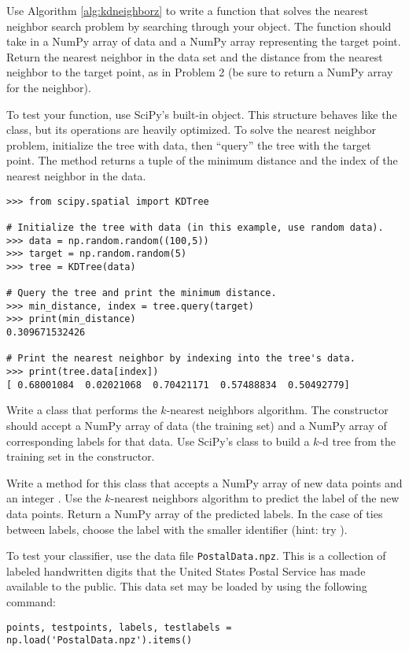 Use Algorithm \ref{alg:kdneighborz} to write a function that solves the nearest neighbor search problem by searching through your  object.
The function should take in a NumPy array of data and a NumPy array representing the target point.
Return the nearest neighbor in the data set and the distance from the nearest neighbor to the target point, as in Problem 2 (be sure to return a NumPy array for the neighbor).

To test your function, use SciPy's built-in  object.
This structure behaves like the  class, but its operations are heavily optimized.
To solve the nearest neighbor problem, initialize the tree with data, then ``query'' the tree with the target point.
The  method returns a tuple of the minimum distance and the index of the nearest neighbor in the data.

\begin{lstlisting}
>>> from scipy.spatial import KDTree

# Initialize the tree with data (in this example, use random data).
>>> data = np.random.random((100,5))
>>> target = np.random.random(5)
>>> tree = KDTree(data)

# Query the tree and print the minimum distance.
>>> min_distance, index = tree.query(target)
>>> print(min_distance)
0.309671532426

# Print the nearest neighbor by indexing into the tree's data.
>>> print(tree.data[index])
[ 0.68001084  0.02021068  0.70421171  0.57488834  0.50492779]
\end{lstlisting}
Write a class that performs the $k$-nearest neighbors algorithm.
The constructor should accept a NumPy array of data (the training set) and a NumPy array of corresponding labels for that data.
Use SciPy's  class to build a $k$-d tree from the training set in the constructor.

Write a method for this class that accepts a NumPy array of new data points and an integer .
Use the $k$-nearest neighbors algorithm to predict the label of the new data points.
Return a NumPy array of the predicted labels.
In the case of ties between labels, choose the label with the smaller identifier (hint: try ).

To test your classifier, use the data file \texttt{PostalData.npz}.
This is a collection of labeled handwritten digits that the United States Postal Service has made available to the public.
This data set may be loaded by using the following command:
\begin{lstlisting}
points, testpoints, labels, testlabels = np.load('PostalData.npz').items()
\end{lstlisting}

